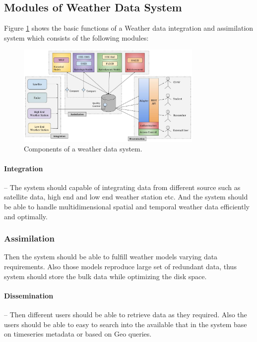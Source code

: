 \subsection{Modules of Weather Data System}
\label{subse:modules_weather_data_integration_sys}

Figure \ref{fi:wdia_components} shows the basic functions of a Weather data integration and assimilation system which consists of the following modules:
\begin{figure}[htbp]
\centerline{\includegraphics[width=0.8\textwidth]{method/misc/weather_data_system_components.jpg}}
\caption{Components of a weather data system.}
\label{fi:wdia_components}
\end{figure}

\paragraph{Integration}-- The system should capable of integrating data from different source such as satellite data, high end and low end weather station etc. And the system should be able to handle multidimensional spatial and temporal weather data efficiently and optimally. 
\subsubsection{Assimilation}
Then the system should be able to fulfill weather models varying data requirements. Also those models reproduce large set of redundant data, thus system should store the bulk data while optimizing the disk space.
\paragraph{Dissemination}-- Then different users should be able to retrieve data as they required. Also the users should be able to easy to search into the available that in the system base on timeseries metadata or based on Geo queries.

